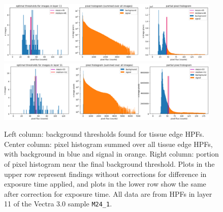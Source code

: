 \documentclass[letterpaper,11pt]{article}
\begin{document}
\begin{figure}[!ht]
\centering
\includegraphics[width=0.95\textwidth]{images/results/thresholding_pre_correction/M24_1_layer_11_background_threshold_plots}
\includegraphics[width=0.95\textwidth]{images/results/thresholding_post_correction/M24_1_layer_11_background_threshold_plots}
\caption{\footnotesize Left column: background thresholds found for tissue edge HPFs. Center column: pixel histogram summed over all tissue edge HPFs, with background in blue and signal in orange. Right column: portion of pixel histogram near the final background threshold. Plots in the upper row represent findings without corrections for difference in exposure time applied, and plots in the lower row show the same after correction for exposure time. All data are from HPFs in layer 11 of the Vectra 3.0 sample \texttt{M24\_1}.}
\label{fig:background_threshold_impact_vectra_layer_11}
\end{figure}
\end{document}
